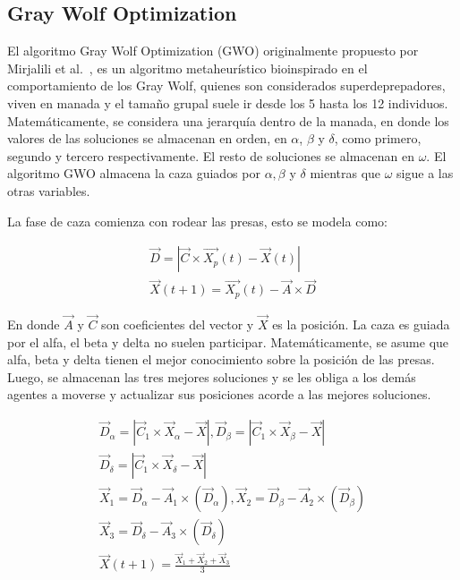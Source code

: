 \documentclass[conference]{IEEEtran}
\begin{document}
\subsection{Gray Wolf Optimization}

\noindent El algoritmo Gray Wolf Optimization (GWO) originalmente propuesto por Mirjalili et al.~\cite{Mirjalili2014}, es un algoritmo metaheurístico bioinspirado en el comportamiento de los Gray Wolf, quienes son considerados superdeprepadores, viven en manada y el tamaño grupal suele ir desde los 5 hasta los 12 individuos. Matemáticamente, se considera una jerarquía dentro de la manada, en donde los valores de las soluciones se almacenan en orden, en $\alpha$, $\beta$ y $\delta$, como primero, segundo y tercero respectivamente. El resto de soluciones se almacenan en $\omega$. El algoritmo GWO almacena la caza guiados por $\alpha,\beta$ y $\delta$ mientras que $\omega$ sigue a las otras variables.

\noindent La fase de caza comienza con rodear las presas, esto se modela como:

\begin{equation}
	\begin{gathered}
		\vec{D} = |\vec{C} \times \vec{X_p}(t)-\vec{X}(t)|\\
		\vec{X}(t+1) = \vec{X_p}(t) - \vec{A} \times \vec{D}
	\end{gathered}
	\label{eq25}
\end{equation}

\noindent En donde $\vec{A}$ y $\vec{C}$ son coeficientes del vector y $\vec{X}$ es la posición. La caza es guiada por el alfa, el beta y delta no suelen participar. Matemáticamente, se asume que alfa, beta y delta tienen el mejor conocimiento sobre la posición de las presas. Luego, se almacenan las tres mejores soluciones y se les obliga a los demás agentes a moverse y actualizar sus posiciones acorde a las mejores soluciones.


\begin{equation}
	\begin{gathered}
		\vec{D}_{\alpha} = |\vec{C}_1 \times \vec{X}_{\alpha} -\vec{X}|, \vec{D}_{\beta} = |\vec{C}_1 \times \vec{X}_{\beta} -\vec{X}| \\
		\vec{D}_{\delta} = |\vec{C}_1 \times \vec{X}_{\delta} -\vec{X}|\\
		\vec{X}_1=\vec{D}_{\alpha}-\vec{A}_1 \times (\vec{D}_{\alpha}), \vec{X}_2=\vec{D}_{\beta}-\vec{A}_2 \times (\vec{D}_{\beta})\\
		\vec{X}_3=\vec{D}_{\delta}-\vec{A}_3 \times (\vec{D}_{\delta}) \\
		\vec{X}(t+1) = \frac{\vec{X}_1+\vec{X}_2+\vec{X}_3}{3}
	\end{gathered}
	\label{eq26}
\end{equation}
\end{document}
